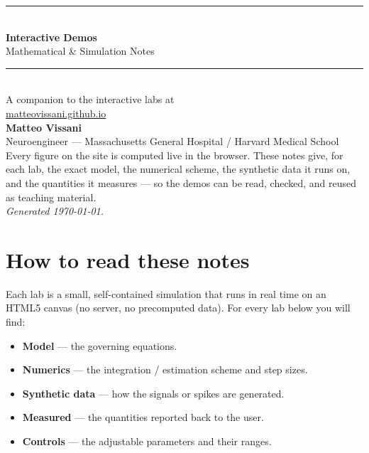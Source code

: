 \documentclass[11pt]{article}
\begin{document}
\begin{titlepage}
\centering
\vspace*{3cm}
{\color{rule}\rule{\textwidth}{2pt}}\\[1.2em]
{\Huge\bfseries Interactive Demos}\\[0.4em]
{\LARGE Mathematical \& Simulation Notes}\\[1em]
{\color{rule}\rule{\textwidth}{2pt}}\\[2em]
{\large A companion to the interactive labs at}\\[0.3em]
{\large\href{https://matteovissani.github.io}{matteovissani.github.io}}\\[3em]
{\large\bfseries Matteo Vissani}\\[0.3em]
{\normalsize Neuroengineer --- Massachusetts General Hospital / Harvard Medical School}\\[2em]
\vfill
{\small Every figure on the site is computed live in the browser. These notes give, for
each lab, the exact model, the numerical scheme, the synthetic data it runs on, and the
quantities it measures --- so the demos can be read, checked, and reused as teaching material.}\\[1em]
{\small\itshape Generated \today.}
\end{titlepage}

\tableofcontents
\newpage

\section*{How to read these notes}

Each lab is a small, self-contained simulation that runs in real time on an HTML5 canvas
(no server, no precomputed data). For every lab below you will find:

\begin{itemize}
  \item \textbf{Model} --- the governing equations.
  \item \textbf{Numerics} --- the integration / estimation scheme and step sizes.
  \item \textbf{Synthetic data} --- how the signals or spikes are generated.
  \item \textbf{Measured} --- the quantities reported back to the user.
  \item \textbf{Controls} --- the adjustable parameters and their ranges.
\end{itemize}
\end{document}
